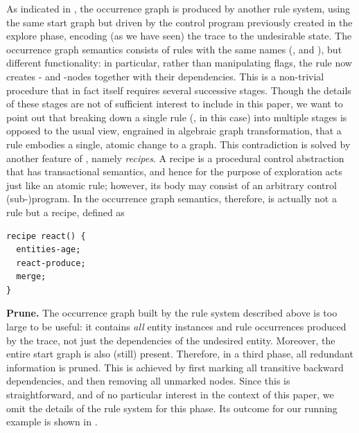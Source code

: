 As indicated in , the occurrence graph is produced by another \GROOVE rule system, using the same start graph but driven by the control program previously created in the explore phase, encoding (as we have seen) the trace to the undesirable state. The occurrence graph semantics consists of rules with the same names (\reactR, \contextR and \firedR), but different functionality: in particular, rather than manipulating \present flags, the \reactR rule now creates \RuleOcc- and \EntityInst-nodes together with their dependencies. This is a non-trivial procedure that in fact itself requires several successive stages. Though the details of these stages are not of sufficient interest to include in this paper, we want to point out that breaking down a single rule (\reactR, in this case) into multiple stages is opposed to the usual view, engrained in algebraic graph transformation, that a rule embodies a single, atomic change to a graph. This contradiction is solved by another feature of \GROOVE, namely \emph{recipes}. A recipe is a procedural control abstraction that has transactional semantics, and hence for the purpose of exploration acts just like an atomic rule; however, its body may consist of an arbitrary control (sub-)program. In the occurrence graph semantics, therefore, \reactR is actually not a rule but a recipe, defined as

\begin{center}
\begin{lstlisting}[]
recipe react() {
  entities-age;
  react-produce;
  merge;
}
\end{lstlisting}
\end{center}
%
\medskip\noindent\textbf{Prune.}
%
The occurrence graph built by the rule system described above is too large to be useful: it contains \emph{all} entity instances and rule occurrences produced by the trace, not just the dependencies of the undesired \Forbidden entity. Moreover, the entire start graph is also (still) present. Therefore, in a third phase, all redundant information is pruned. This is achieved by first marking all transitive backward dependencies, and then removing all unmarked nodes. Since this is straightforward, and of no particular interest in the context of this paper, we omit the details of the \GROOVE rule system for this phase. Its outcome for our running example is shown in .


